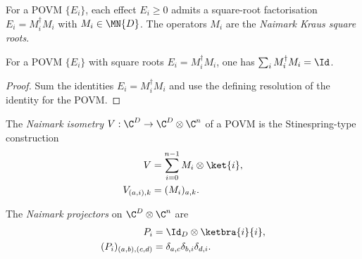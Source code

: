 \begin{definition}\label{def:naimark_kraus}
    \leanok
    For a POVM $\{E_i\}$, each effect $E_i\ge0$ admits a square-root
    factorisation $E_i=M_i^\dagger M_i$ with $M_i\in\MN{D}$. The
    operators $M_i$ are the \emph{Naimark Kraus square roots}.
\end{definition}

\begin{theorem}
    \label{lem:naimark_square_root_normalization}
    \leanok
    For a POVM $\{E_i\}$ with square roots $E_i=M_i^\dagger M_i$,
    one has $\sum_iM_i^\dagger M_i=\Id$.
\end{theorem}

\begin{proof}\leanok
    Sum the identities $E_i=M_i^\dagger M_i$ and use the defining
    resolution of the identity for the POVM.
\end{proof}

\begin{definition}\label{def:naimark_isometry}
    \leanok
    The \emph{Naimark isometry} $V:\C^D\to\C^D\otimes\C^n$ of a POVM
    is the Stinespring-type construction
    \begin{align}
        V
        &=\sum_{i=0}^{n-1}M_i\otimes\ket{i},
        \notag\\
        V_{(a,i),k}
        &=(M_i)_{a,k}.
        \label{eq:representations_naimark_isometry}
    \end{align}
\end{definition}

\begin{definition}\label{def:naimark_projection}
    \leanok
    The \emph{Naimark projectors} on $\C^D\otimes\C^n$ are
    \begin{align}
        P_i
        &=\Id_D\otimes\ketbra{i}{i},
        \notag\\
        (P_i)_{(a,b),(c,d)}
        &=\delta_{a,c}\delta_{b,i}\delta_{d,i}.
        \label{eq:representations_naimark_projectors}
    \end{align}
\end{definition}

